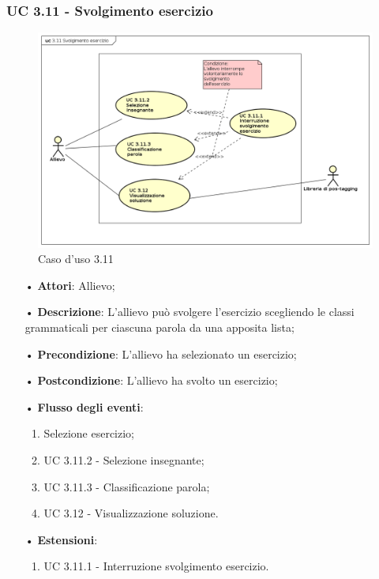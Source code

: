 \subsubsection{UC 3.11 - Svolgimento esercizio}
\begin{figure}[H]
	\centering
	\includegraphics[width=17cm]{img/UC311.png} 
	\caption{Caso d'uso 3.11}\label{fig:311}
\end{figure}
\begin{itemize}
	\item[•]\textbf{Attori}: Allievo;
	\item[•]\textbf{Descrizione}: L'allievo può svolgere l'esercizio scegliendo le classi grammaticali per ciascuna parola da una apposita lista;
	\item[•]\textbf{Precondizione}: L'allievo ha selezionato un esercizio;
	\item[•]\textbf{Postcondizione}: L'allievo ha svolto un esercizio;
	\item[•]\textbf{Flusso degli eventi}:
	\begin{enumerate}
		\item Selezione esercizio;
		\item UC 3.11.2 - Selezione insegnante;
		\item UC 3.11.3 - Classificazione parola;
		\item UC 3.12 - Visualizzazione soluzione.
	\end{enumerate}
	\item[•]\textbf{Estensioni}:
	\begin{enumerate}
		\item UC 3.11.1 - Interruzione svolgimento esercizio.
	\end{enumerate}
\end{itemize}

